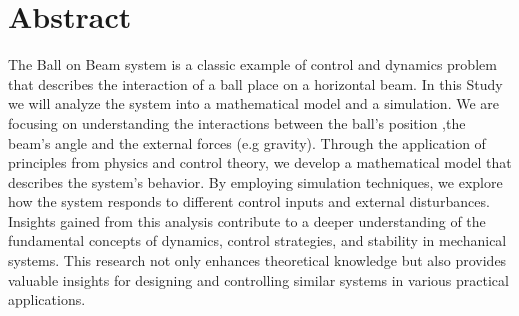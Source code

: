 \chapter{Abstract}


The Ball on Beam system is a classic example of control and dynamics problem that describes
the interaction of a ball place on a horizontal beam.
In this Study we will analyze the system into a mathematical model and a simulation.
We are focusing on understanding the interactions between the ball's position ,the beam's angle
and the external forces (e.g gravity).
Through the application of principles from physics and control theory,
we develop a mathematical model that describes the system's behavior.
By employing simulation techniques, we explore how the system responds to different control inputs and external disturbances.
Insights gained from this analysis contribute to a deeper understanding of the fundamental concepts of dynamics, control strategies, and stability in mechanical systems.
This research not only enhances theoretical knowledge but also provides valuable insights for designing and controlling similar systems in various practical applications.
